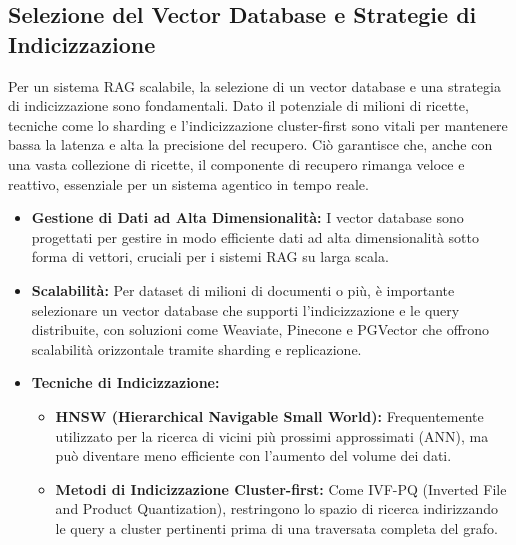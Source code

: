 \documentclass[a4paper, 11pt]{article}
\begin{document}
\subsection{Selezione del Vector Database e Strategie di Indicizzazione}
Per un sistema RAG scalabile, la selezione di un vector database e una strategia di indicizzazione sono fondamentali. Dato il potenziale di milioni di ricette, tecniche come lo sharding e l'indicizzazione cluster-first sono vitali per mantenere bassa la latenza e alta la precisione del recupero. \cite{scaling_rag_millions} Ciò garantisce che, anche con una vasta collezione di ricette, il componente di recupero rimanga veloce e reattivo, essenziale per un sistema agentico in tempo reale.
\begin{itemize}
    \item \textbf{Gestione di Dati ad Alta Dimensionalità:} I vector database sono progettati per gestire in modo efficiente dati ad alta dimensionalità sotto forma di vettori, cruciali per i sistemi RAG su larga scala. \cite{vector_databases_tutorial}
    \item \textbf{Scalabilità:} Per dataset di milioni di documenti o più, è importante selezionare un vector database che supporti l'indicizzazione e le query distribuite, con soluzioni come Weaviate, Pinecone e PGVector che offrono scalabilità orizzontale tramite sharding e replicazione. \cite{scaling_rag_millions}
    \item \textbf{Tecniche di Indicizzazione:}
    \begin{itemize}
        \item \textbf{HNSW (Hierarchical Navigable Small World):} Frequentemente utilizzato per la ricerca di vicini più prossimi approssimati (ANN), ma può diventare meno efficiente con l'aumento del volume dei dati. \cite{scaling_rag_millions}
        \item \textbf{Metodi di Indicizzazione Cluster-first:} Come IVF-PQ (Inverted File and Product Quantization), restringono lo spazio di ricerca indirizzando le query a cluster pertinenti prima di una traversata completa del grafo. \cite{scaling_rag_millions}
    \end{itemize}
\end{itemize}
\end{document}
